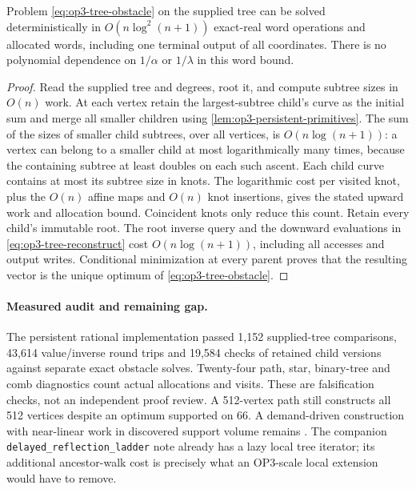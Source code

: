 \begin{theorem}
\label{thm:op3-persistent-tree}
Problem \eqref{eq:op3-tree-obstacle} on the supplied tree can be solved
deterministically in $O(n\log^2(n+1))$ exact-real word operations and
allocated words, including one terminal output of all coordinates. There
is no polynomial dependence on $1/\alpha$ or $1/\lambda$ in this word bound.
\end{theorem}
\begin{proof}
Read the supplied tree and degrees, root it, and compute subtree sizes in
$O(n)$ work. At each vertex retain the largest-subtree child's curve as
the initial sum and merge all smaller children using
\cref{lem:op3-persistent-primitives}. The sum of the sizes of smaller child
subtrees, over all vertices, is $O(n\log(n+1))$: a vertex can belong to a
smaller child at most logarithmically many times, because the containing
subtree at least doubles on each such ascent. Each child curve contains
at most its subtree size in knots. The logarithmic cost per visited knot,
plus the $O(n)$ affine maps and $O(n)$ knot insertions, gives the stated
upward work and allocation bound. Coincident knots only reduce this count.
Retain every child's immutable root. The root inverse query and the
downward evaluations in \cref{eq:op3-tree-reconstruct} cost
$O(n\log(n+1))$, including all accesses and output writes. Conditional
minimization at every parent proves that the resulting vector is the
unique optimum of \cref{eq:op3-tree-obstacle}.
\end{proof}

\paragraph{Measured audit and remaining gap.}
The persistent rational implementation passed
1,152 supplied-tree comparisons, 43,614 value/inverse round trips and
19,584 checks of retained child versions against separate exact obstacle
solves. Twenty-four path, star, binary-tree and comb diagnostics count
actual allocations and visits. These are falsification checks, not an
independent proof review. A 512-vertex path still constructs all 512
vertices despite an optimum supported on 66. A demand-driven construction
with near-linear work in discovered support volume remains \statusopen{}.
The companion \texttt{delayed\_reflection\_ladder} note already has a lazy
local tree iterator; its additional ancestor-walk cost is precisely what
an OP3-scale local extension would have to remove.

